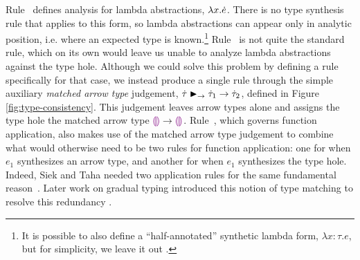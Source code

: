 Rule~ defines analysis for lambda abstractions,
$\lambda x.\dot{e}$. There is no type synthesis rule that applies  
to this form, so lambda abstractions can appear only in analytic position,
i.e. where an expected type is known.\footnote{It is possible to also define a
  ``half-annotated'' synthetic lambda form, $\lambda x{:}\tau.e$, but for
  simplicity, we leave it out \cite{DBLP:conf/tldi/ChlipalaPH05}.}  Rule~ is not quite the standard rule,
%
which on its own would leave us unable to analyze
lambda abstractions against the type hole.
Although we could solve this problem by defining a rule 
specifically for that case, we 
instead produce a single rule through the
simple auxiliary \emph{matched arrow type} judgement,
$\dot{\tau} \blacktriangleright_{\rightarrow} \dot{\tau}_1 \rightarrow \dot{\tau}_2$, defined in Figure
\ref{fig:type-consistency}. This judgement leaves arrow types alone and
assigns the type hole the matched arrow type $\textcolor{violet}{\llparenthesis}\textcolor{violet}{\rrparenthesis} \rightarrow \textcolor{violet}{\llparenthesis}\textcolor{violet}{\rrparenthesis}$.  
Rule~, which governs function
application, also makes use of the matched arrow type judgement to
combine what would otherwise need to be two rules for function application:
one for when $e_1$ synthesizes an arrow type, and another for when $e_1$
synthesizes the type hole. Indeed, Siek and Taha needed two application
rules for the same fundamental reason~\cite{Siek06a}. Later work on gradual
typing introduced this notion of type matching to resolve this redundancy \cite{DBLP:conf/popl/CiminiS16,DBLP:conf/popl/GarciaC15,DBLP:conf/popl/RastogiCH12}.


